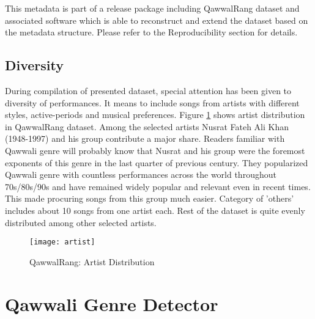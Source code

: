 \documentclass{article}
\begin{document}
This metadata is part of a release package including QawwalRang dataset and associated software which is able to reconstruct and extend the dataset based on the metadata structure. Please refer to the Reproducibility section for details.

\subsection{Diversity}

During compilation of presented dataset, special attention has been given to diversity of performances. It means to include songs from artists with different styles, active-periods and musical preferences. Figure \ref{fig:author_dist} shows artist distribution in QawwalRang dataset. Among the selected artists Nusrat Fateh Ali Khan (1948-1997) \citep{nusrat} and his group contribute a major share. Readers familiar with Qawwali genre will probably know that Nusrat and his group were the foremost exponents of this genre in the last quarter of previous century. They popularized Qawwali genre with countless performances across the world throughout 70s/80s/90s and have remained widely popular and relevant even in recent times. This made procuring songs from this group much easier. Category of 'others' includes about 10 songs from one artist each. Rest of the dataset is quite evenly distributed among other selected artists.

\begin{figure}[htbp]
  \centering
  \texttt{[image: artist]}
  \caption{QawwalRang: Artist Distribution}
\label{fig:author_dist}
\end{figure}

\section{Qawwali Genre Detector}\label{sec:detector}
\end{document}
